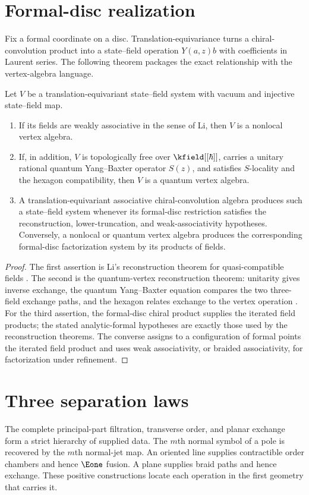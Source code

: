 \section{Formal-disc realization}
Fix a formal coordinate on a disc.  Translation-equivariance turns a chiral-convolution product into a state--field operation $Y(a,z)b$ with coefficients in Laurent series.  The following theorem packages the exact relationship with the vertex-algebra language.

\begin{theorem}
Let $V$ be a translation-equivariant state--field system with vacuum and injective state--field map.
\begin{enumerate}
\item If its fields are weakly associative in the sense of Li, then $V$ is a nonlocal vertex algebra.
\item If, in addition, $V$ is topologically free over $\kfield[[\hbar]]$, carries a unitary rational quantum Yang--Baxter operator $S(z)$, and satisfies $S$-locality and the hexagon compatibility, then $V$ is a quantum vertex algebra.
\item A translation-equivariant associative chiral-convolution algebra produces such a state--field system whenever its formal-disc restriction satisfies the reconstruction, lower-truncation, and weak-associativity hypotheses.  Conversely, a nonlocal or quantum vertex algebra produces the corresponding formal-disc factorization system by its products of fields.
\end{enumerate}
\end{theorem}
\begin{proof}
The first assertion is Li's reconstruction theorem for quasi-compatible fields \cite{LiNonlocal}.  The second is the quantum-vertex reconstruction theorem: unitarity gives inverse exchange, the quantum Yang--Baxter equation compares the two three-field exchange paths, and the hexagon relates exchange to the vertex operation \cite{LiQVA,DSGKQVA}.  For the third assertion, the formal-disc chiral product supplies the iterated field products; the stated analytic-formal hypotheses are exactly those used by the reconstruction theorems.  The converse assigns to a configuration of formal points the iterated field product and uses weak associativity, or braided associativity, for factorization under refinement.
\end{proof}

\section{Three separation laws}
The complete principal-part filtration, transverse order, and planar exchange form a strict hierarchy of supplied data.  The $m$th normal symbol of a pole is recovered by the $m$th normal-jet map.  An oriented line supplies contractible order chambers and hence $\Eone$ fusion.  A plane supplies braid paths and hence exchange.  These positive constructions locate each operation in the first geometry that carries it.

